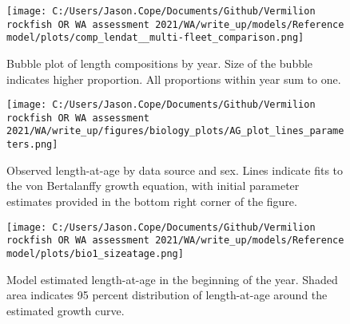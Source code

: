 \documentclass[11pt,
  english,
  a4paper,
]{article}
\begin{document}
\tagmcend\tagstructend


\begin{figure}
\centering
\texttt{[image: C:/Users/Jason.Cope/Documents/Github/Vermilion rockfish OR WA assessment 2021/WA/write\_up/models/Reference model/plots/comp\_lendat\_\_multi-fleet\_comparison.png]}
\caption{Bubble plot of length compositions by year. Size of the bubble indicates higher proportion. All proportions within year sum to one.\label{fig:rec-lts_bubbs}}
\end{figure}

\tagmcend\tagstructend


\begin{figure}
\centering
\texttt{[image: C:/Users/Jason.Cope/Documents/Github/Vermilion rockfish OR WA assessment 2021/WA/write\_up/figures/biology\_plots/AG\_plot\_lines\_parameters.png]}
\caption{Observed length-at-age by data source and sex. Lines indicate fits to the von Bertalanffy growth equation, with initial parameter estimates provided in the bottom right corner of the figure.\label{fig:len-age-data}}
\end{figure}

\tagmcend\tagstructend


\begin{figure}
\centering
\texttt{[image: C:/Users/Jason.Cope/Documents/Github/Vermilion rockfish OR WA assessment 2021/WA/write\_up/models/Reference model/plots/bio1\_sizeatage.png]}
\caption{Model estimated length-at-age in the beginning of the year. Shaded area indicates 95 percent distribution of length-at-age around the estimated growth curve.\label{fig:len-age-ss}}
\end{figure}
\end{document}
